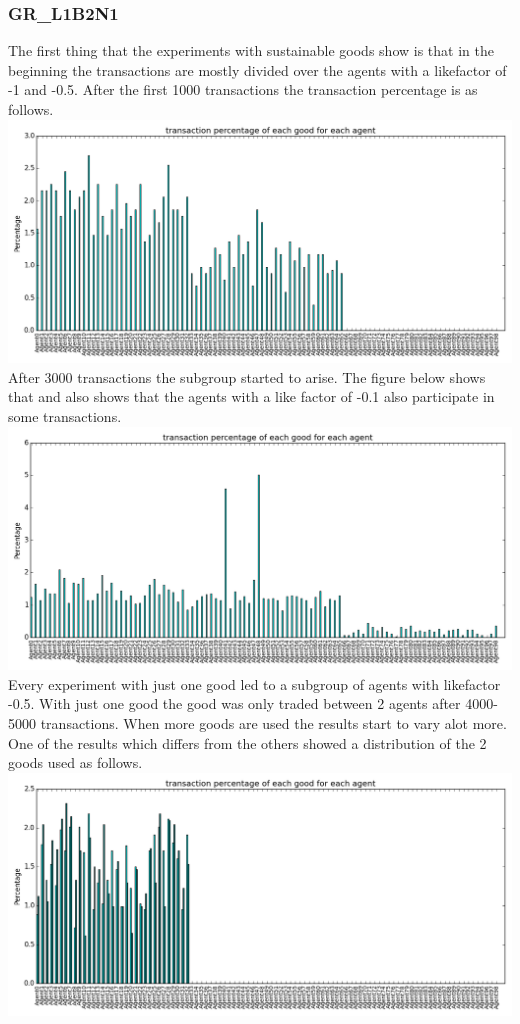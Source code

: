 \documentclass[twoside,openright]{uva-bachelor-thesis}
\begin{document}
\subsubsection{GR\_L1B2N1}
The first thing that the experiments with sustainable goods show is that in the beginning the transactions are mostly divided over the agents with a likefactor of -1 and -0.5. After the first 1000 transactions the transaction percentage is as follows. \\
\includegraphics[scale=0.4]{GR_L1B2N1/1000transactions}
After 3000 transactions the subgroup started to arise. The figure below shows that and also shows that the agents with a like factor of -0.1 also participate in some transactions. \\
\includegraphics[scale=0.4]{GR_L1B2N1/3-5ktransactions1good}
 Every experiment with just one good led to a subgroup of agents with likefactor -0.5. With just one good the good was  only traded between 2 agents after 4000-5000 transactions. When more goods are used the results start to vary alot more. One of the results which differs from the others showed a distribution of the 2 goods used as follows. \\
\includegraphics[scale=0.4]{GR_L1B2N1/30000transaction2}
\end{document}
